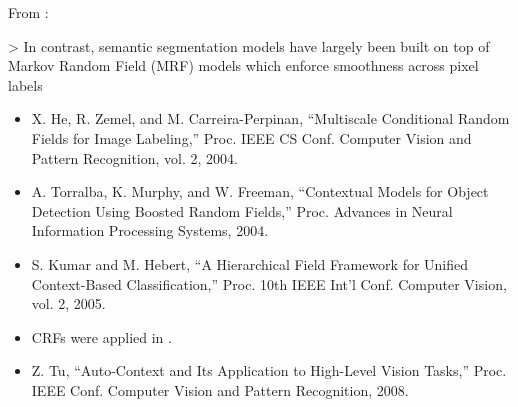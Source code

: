 








From \cite{yang2012layered}:

> In contrast, semantic segmentation models have largely been built on top of
Markov Random Field (MRF) models which enforce smoothness across pixel labels

\begin{itemize}
    \item X. He, R. Zemel, and M. Carreira-Perpinan, “Multiscale Conditional
          Random Fields for Image Labeling,” Proc. IEEE CS Conf. Computer
          Vision and Pattern Recognition, vol. 2, 2004.
    \item A. Torralba, K. Murphy, and W. Freeman, “Contextual Models for
          Object Detection Using Boosted Random Fields,” Proc. Advances in
          Neural Information Processing Systems, 2004.
    \item S. Kumar and M. Hebert, “A Hierarchical Field Framework for
          Unified Context-Based Classification,” Proc. 10th IEEE Int’l Conf.
          Computer Vision, vol. 2, 2005.
    \item \Glspl{CRF} were applied in \cite{shotton2006textonboost}.
    \item Z. Tu, “Auto-Context and Its Application to High-Level Vision
          Tasks,” Proc. IEEE Conf. Computer Vision and Pattern Recognition,
          2008.
\end{itemize}
